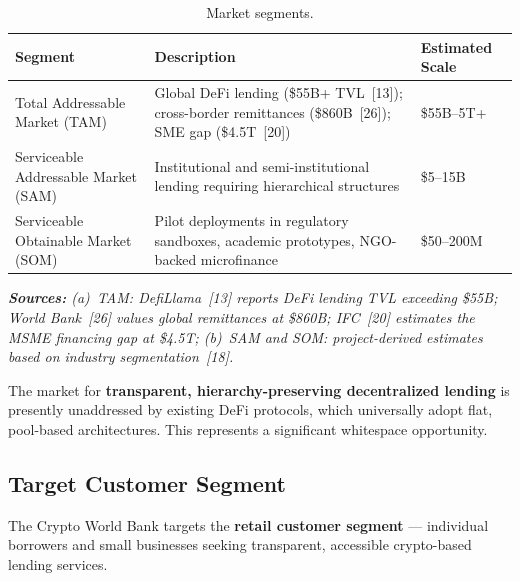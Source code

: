 \documentclass[12pt,a4paper]{report}
\newcommand{\tableheadfont}{\bfseries\small\color{PrimaryBlue}}
\newenvironment{moderntable}[1][H]{%
    \begin{table}[#1]\centering\small%
    \renewcommand{\arraystretch}{1.35}%
}{%
    \end{table}%
}
\begin{document}
\begin{moderntable}
\caption{Market segments.}
\begin{tabular}{@{} >{\raggedright}p{4cm} >{\raggedright}p{5cm} >{\raggedright\arraybackslash}p{3cm} @{}}
\toprule
\tableheadfont Segment & \tableheadfont Description & \tableheadfont Estimated Scale \\
\midrule
\rowcolor{RowShade}
Total Addressable Market (TAM) & Global DeFi lending (\$55B+ TVL~[13]); cross-border remittances (\$860B~[26]); SME gap (\$4.5T~[20]) & \$55B--5T+ \\
Serviceable Addressable Market (SAM) & Institutional and semi-institutional lending requiring hierarchical structures & \$5--15B \\
\rowcolor{RowShade}
Serviceable Obtainable Market (SOM) & Pilot deployments in regulatory sandboxes, academic prototypes, NGO-backed microfinance & \$50--200M \\
\bottomrule
\end{tabular}
\end{moderntable}

\vspace{4pt}
\noindent\textit{\small\textbf{Sources:} (a)~TAM: DefiLlama~[13] reports DeFi lending TVL exceeding \$55B; World Bank~[26] values global remittances at \$860B; IFC~[20] estimates the MSME financing gap at \$4.5T; (b)~SAM and SOM: project-derived estimates based on industry segmentation~[18].}

The market for \textbf{transparent, hierarchy-preserving decentralized lending} is presently unaddressed by existing DeFi protocols, which universally adopt flat, pool-based architectures. This represents a significant whitespace opportunity.

\subsection{Target Customer Segment}

The Crypto World Bank targets the \textbf{retail customer segment} --- individual borrowers and small businesses seeking transparent, accessible crypto-based lending services.
\end{document}
